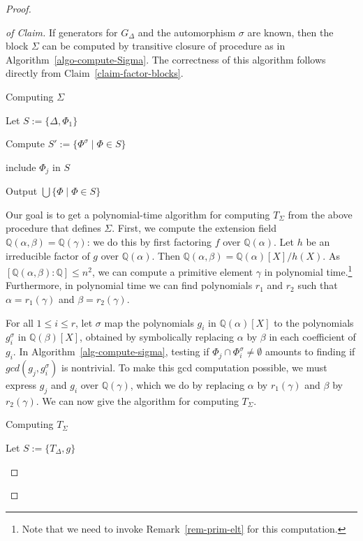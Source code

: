 \documentclass[prodmod,acmtalg]{acmsmall}
\newcommand{\Q}{\ensuremath{\mathbb{Q}}}
\begin{document}
\begin{proof}
\begin{proof}[of Claim]
  If generators for $G_\Delta$ and the automorphism $\sigma$ are
  known, then the block $\Sigma$ can be computed by transitive closure
  of procedure as in Algorithm~\ref{algo-compute-Sigma}. The
  correctness of this algorithm follows directly from
  Claim~\ref{claim-factor-blocks}.

  \begin{algorithm}
    \caption{Computing $\Sigma$}\label{algo-compute-Sigma}%
    \label{alg-compute-sigma}
    Let $S:= \{\Delta,\Phi_1\}$

     {%
      Compute $S':=\{\Phi^\sigma\mid \Phi\in S\}$

	  {include $\Phi_j$ in $S$}%
    }

    Output $\bigcup\{\Phi\mid \Phi\in S\}$%
  \end{algorithm}

  Our goal is to get a polynomial-time algorithm for computing
  $T_\Sigma$ from the above procedure that defines $\Sigma$.  First,
  we compute the extension field $\Q(\alpha,\beta)=\Q(\gamma)$: we do
  this by first factoring $f$ over $\Q(\alpha)$. Let $h$ be an
  irreducible factor of $g$ over $\Q(\alpha)$. Then
  $\Q(\alpha,\beta)=\Q (\alpha)[X]/h(X)$. As
  $[\Q(\alpha,\beta):\Q]\leq n^2$, we can compute a primitive element
  $\gamma$ in polynomial time.\footnote{Note that we need to invoke
    Remark~\ref{rem-prim-elt} for this computation.} Furthermore, in
  polynomial time we can find polynomials $r_1$ and $r_2$ such that
  $\alpha=r_1(\gamma)$ and $\beta=r_2(\gamma)$.

  For all $1 \leq i \leq r$, let $\sigma$ map the polynomials $g_i$ in
  $\Q(\alpha)[X]$ to the polynomials $g_i^\sigma$ in $\Q(\beta)[X]$,
  obtained by symbolically replacing $\alpha$ by $\beta$ in each
  coefficient of $g_i$.  In Algorithm~\ref{alg-compute-sigma}, testing
  if $\Phi_j\cap\Phi_i^\sigma\neq\emptyset$ amounts to finding if
  $gcd(g_j,g_i^\sigma)$ is nontrivial. To make this gcd computation
  possible, we must express $g_j$ and $g_i$ over $\Q(\gamma)$, which
  we do by replacing $\alpha$ by $r_1(\gamma)$ and $\beta$ by
  $r_2(\gamma)$.  We can now give the algorithm for computing
  $T_\Sigma$.

  \begin{algorithm}
    \caption{Computing $T_\Sigma$}%

    \label{alg-enlarge-block}

    Let $S:= \{T_\Delta,g\}$%


\end{algorithm}
\end{proof}
\end{proof}
\end{document}
